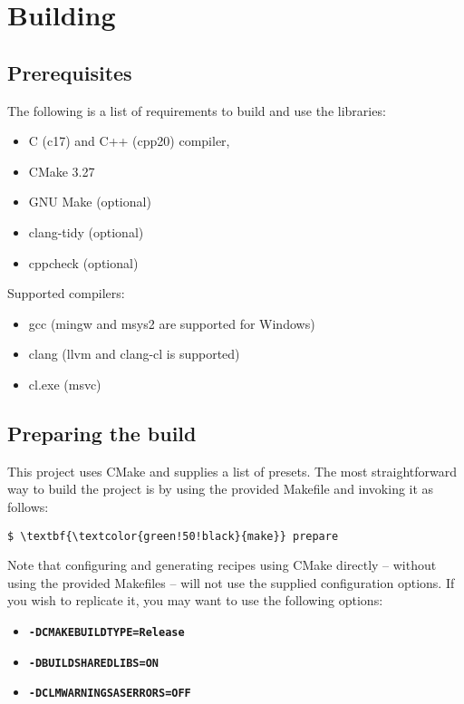 \section{Building}

\subsection*{Prerequisites}

The following is a list of requirements to build and use the libraries:
\begin{itemize}
    \item C (c17) and C++ (cpp20) compiler,
    \item CMake 3.27
    \item GNU Make (optional)
    \item clang-tidy (optional)
    \item cppcheck (optional)
\end{itemize}
Supported compilers:
\begin{itemize}
    \item gcc (mingw and msys2 are supported for Windows\texttrademark)
    \item clang (llvm and clang-cl is supported)
    \item cl.exe (msvc)
\end{itemize}

\subsection*{Preparing the build}

This project uses CMake and supplies a list of presets. The most straightforward way to build the project is by using the provided Makefile and invoking it as follows:
\begin{Verbatim}[commandchars=\\\{\}]
    $ \textbf{\textcolor{green!50!black}{make}} prepare
\end{Verbatim}

Note that configuring and generating recipes using CMake directly -- without using the provided Makefiles -- will not use the supplied configuration options. If you wish to replicate it, you may want to use the following options:
\begin{itemize}
    \item \textbf{\texttt{-DCMAKE\textunderscore BUILD\textunderscore TYPE=\textcolor{blue!80!black}{Release}}}
    \item \textbf{\texttt{-DBUILD\textunderscore SHARED\textunderscore LIBS=\textcolor{blue!80!black}{ON}}}
    \item \textbf{\texttt{-DCLM\textunderscore WARNINGS\textunderscore AS\textunderscore ERRORS=\textcolor{blue!80!black}{OFF}}}
\end{itemize}

